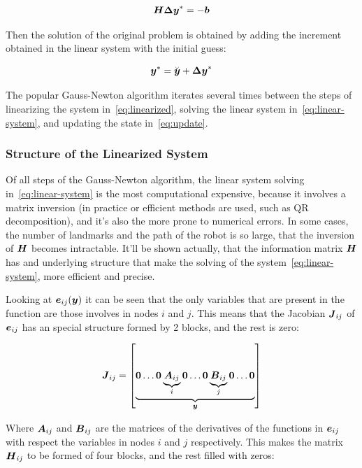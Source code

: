 \begin{equation}
\boldsymbol{H \Delta y}^* = -\boldsymbol{b}
\label{eq:linear-system}
\end{equation}

Then the solution of the original problem is obtained by adding the increment obtained in the linear system with the initial guess:

\begin{equation}
\boldsymbol{y}^* = \breve{\boldsymbol{y}}+ \boldsymbol{\Delta y}^*
\label{eq:update}
\end{equation}

The popular Gauss-Newton algorithm iterates several times between the steps of linearizing the system in~\eqref{eq:linearized}, solving the linear system in~\eqref{eq:linear-system}, and updating the state in~\eqref{eq:update}.  

\subsubsection{Structure of the Linearized System}

Of all steps of the Gauss-Newton algorithm, the linear system solving in~\eqref{eq:linear-system} is the most computational expensive, because it involves a matrix inversion (in practice or efficient methods are used, such as QR decomposition), and it's also the more prone to numerical errors. In some cases, the number of landmarks and the path of the robot is so large, that the inversion of $\boldsymbol{H}$ becomes intractable. It'll be shown actually, that the information matrix $\boldsymbol{H}$ has and underlying structure that make the solving of the system~\eqref{eq:linear-system}, more efficient and precise.


Looking at $\boldsymbol{e}_{ij}(\boldsymbol{y})$ it can be seen that the only variables that are present in the function are those involves in nodes $i$ and $j$. This means that the Jacobian $\boldsymbol{J}_{ij}$ of $\boldsymbol{e}_{ij}$ has an special structure formed by 2 blocks, and the rest is zero:

\begin{equation}
\boldsymbol{J}_{ij} = \left[ \underbrace{\boldsymbol{0} \dots \boldsymbol{0} 
    \underbrace{\boldsymbol{A}_{ij}}_{i} \boldsymbol{0} \dots \boldsymbol{0} 
    \underbrace{\boldsymbol{B}_{ij}}_{j}
    \boldsymbol{0} \dots \boldsymbol{0}}_{\boldsymbol{y}} \right] 
\end{equation}

Where $\boldsymbol{A}_{ij}$ and $\boldsymbol{B}_{ij}$ are the matrices of the derivatives of the functions in $\boldsymbol{e}_{ij}$ with respect the variables in nodes $i$ and $j$ respectively. This makes the matrix $\boldsymbol{H}_{ij}$ to be formed of four blocks, and the rest filled with zeros:


